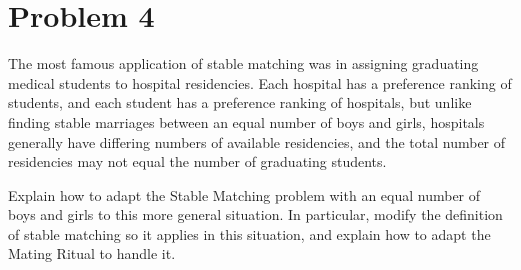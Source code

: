 \documentclass[14pt]{extarticle}
\begin{document}
\section{Problem 4}
The most famous application of stable matching was in assigning graduating medical students to hospital residencies. Each hospital has a preference ranking of students, and each student has a preference ranking of hospitals, but unlike finding stable marriages between an equal number of boys and girls, hospitals generally have differing numbers of available residencies, and the total number of residencies may not equal the number of graduating students.

Explain how to adapt the Stable Matching problem with an equal number of boys and girls to this more general situation. In particular, modify the definition of stable matching so it applies in this situation, and explain how to adapt the Mating Ritual to handle it.
\end{document}
